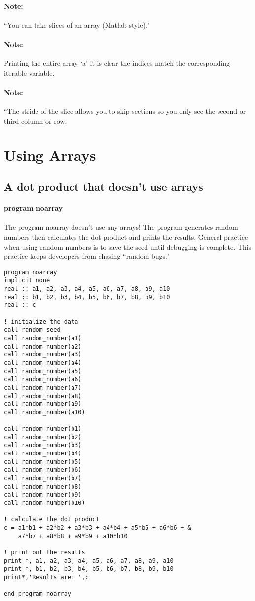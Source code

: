 \documentclass[11pt]{article}
\begin{document}
\paragraph{Note:}``You can take slices of an array (Matlab style)."

\paragraph{Note:}Printing the entire array `a' it is clear the indices match the corresponding iterable variable.

\paragraph{Note:}``The stride of the slice allows you to skip sections so you only see the second or third column or row.

\vfill
\section{Using Arrays}
\subsection{A dot product that doesn't use arrays}

\paragraph{program noarray}The program noarray doesn't use any arrays! The program generates random numbers then calculates the dot product and prints the results. General practice when using random numbers is to save the seed until debugging is complete. This practice keeps developers from chasing ``random bugs."\\

\begin{lstlisting}
program noarray
implicit none
real :: a1, a2, a3, a4, a5, a6, a7, a8, a9, a10
real :: b1, b2, b3, b4, b5, b6, b7, b8, b9, b10
real :: c

! initialize the data
call random_seed
call random_number(a1)
call random_number(a2)
call random_number(a3)
call random_number(a4)
call random_number(a5)
call random_number(a6)
call random_number(a7)
call random_number(a8)
call random_number(a9)
call random_number(a10)

call random_number(b1)
call random_number(b2)
call random_number(b3)
call random_number(b4)
call random_number(b5)
call random_number(b6)
call random_number(b7)
call random_number(b8)
call random_number(b9)
call random_number(b10)

! calculate the dot product
c = a1*b1 + a2*b2 + a3*b3 + a4*b4 + a5*b5 + a6*b6 + &
    a7*b7 + a8*b8 + a9*b9 + a10*b10

! print out the results
print *, a1, a2, a3, a4, a5, a6, a7, a8, a9, a10
print *, b1, b2, b3, b4, b5, b6, b7, b8, b9, b10
print*,'Results are: ',c

end program noarray
\end{lstlisting}
\end{document}
